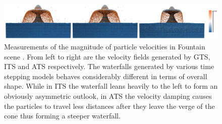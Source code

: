 \documentclass[
	11pt, 
	DIV10,
	ngerman,
	a4paper, 
	oneside, 
	headings=normal, 
	captions=tableheading,
	final, 
	numbers=noenddot
]{scrartcl}
\begin{document}
\begin{figure}[tb]
	\centering
	\includegraphics[scale=0.18]{images/9}
	\caption{\label{fig9} Measurements of the magnitude of particle velocities in Fountain scene \cite{reinhardt2017fully}. From left to right are the velocity fields generated by GTS, ITS and ATS respectively. The waterfalls generated by various time stepping models behaves considerably different in terms of overall shape. While in ITS the waterfall leans heavily to the left to form an obviously asymmetric outlook, in ATS the velocity damping causes the particles to travel less distances after they leave the verge of the cone thus forming a steeper waterfall.}
\end{figure}
\end{document}
